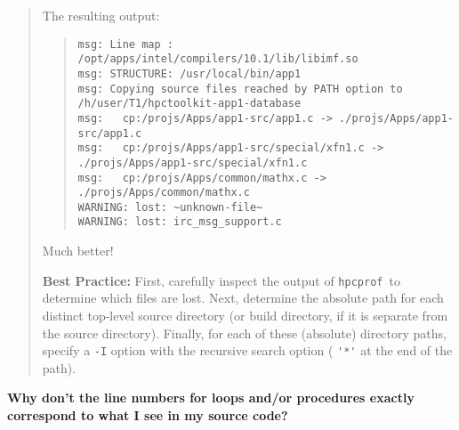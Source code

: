 \documentclass{article}
\newcommand{\hpcprof}{\texttt{hpcprof}}
\begin{document}
\begin{quote}
The resulting output:
\begin{quote}
\begin{Verbatim}[fontsize=\small]
msg: Line map : /opt/apps/intel/compilers/10.1/lib/libimf.so
msg: STRUCTURE: /usr/local/bin/app1
msg: Copying source files reached by PATH option to /h/user/T1/hpctoolkit-app1-database
msg:   cp:/projs/Apps/app1-src/app1.c -> ./projs/Apps/app1-src/app1.c
msg:   cp:/projs/Apps/app1-src/special/xfn1.c -> ./projs/Apps/app1-src/special/xfn1.c
msg:   cp:/projs/Apps/common/mathx.c -> ./projs/Apps/common/mathx.c
WARNING: lost: ~unknown-file~
WARNING: lost: irc_msg_support.c
\end{Verbatim}
\end{quote}
\nobreak Much better!


\textbf{Best Practice:} First, carefully inspect the output of \hpcprof\ to
determine which files are lost. Next, determine the absolute path for
each distinct top-level source directory (or build directory, if it 
is separate from the source directory). Finally, for each of these (absolute) directory paths,
specify a \verb|-I| option with the recursive search option ( \verb|'*'| at the end
of the path).

\end{quote}

\begin{comment}
   possible question: What happens if I forget to run hpcstruct?  
No hpcstruct = 
   really crazy procedure & loop bounds
   no inlining detection!
\end{comment}

\textbf{Why don't the line numbers for loops and/or procedures exactly
correspond to what I see in my source code?}
\end{document}
